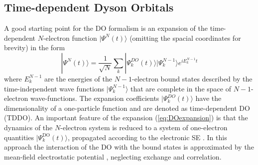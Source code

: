 \subsection{Time-dependent Dyson Orbitals}
A good starting point for the DO formalism is an expansion of the time-dependent $N$-electron function $|\Psi^N(t)\rangle$ (omitting the spacial coordinates for brevity) in the form
\begin{equation} \label{eq:DOexpansion}
| \Psi^N (t)\rangle =\frac{1}{\sqrt{N}} \sum_k |\Psi_k^{DO}(t)\rangle | \Psi^{N-1}_k \rangle e^{iE_k^{N-1}t}
\end{equation}
where $E_k^{N-1}$ are the energies of the $N-1$-electron bound states described by the time-independent wave functions $|\Psi_k^{N-1}\rangle$ that are complete in the space of $N-1$-electron wave-functions.
The expansion coefficients $|\Psi_k^{DO}(t)\rangle$ have the dimensionality of a one-particle function and are denoted as time-dependent DO (TDDO).
An important feature of the expansion (\ref{eq:DOexpansion}) is that the dynamics of the $N$-electron system is reduced to a system of one-electron quantities $|\Psi_k^\text{DO}(t)\rangle$, propagated according to the electronic SE \cite{TD-do}.
In this approach the interaction of the DO with the bound states is approximated by the mean-field electrostatic potential \cite{TD-do}, neglecting exchange and correlation.

